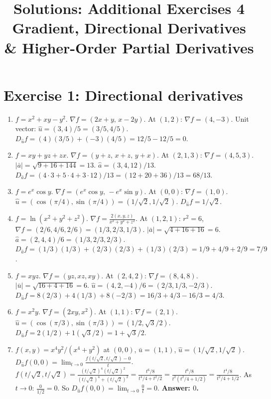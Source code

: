\documentclass[12pt,a4paper]{article}
\title{\textbf{Solutions: Additional Exercises 4}\\
\large Gradient, Directional Derivatives \& Higher-Order Partial Derivatives}
\date{}
\begin{document}
\maketitle
\thispagestyle{empty}

\section*{Exercise 1: Directional derivatives}

\begin{enumerate}[leftmargin=*, label=(\alph*)]

\item $f=x^2+xy-y^2$. $\nabla f=(2x+y,\,x-2y)$. At $(1,2)$: $\nabla f=(4,-3)$.
Unit vector: $\hat{u}=(3,4)/5=(3/5,4/5)$.
$D_{\hat{u}}f=(4)(3/5)+(-3)(4/5)=12/5-12/5=0$.

\item $f=xy+yz+zx$. $\nabla f=(y+z,\,x+z,\,y+x)$. At $(2,1,3)$: $\nabla f=(4,5,3)$.
$|\bar{a}|=\sqrt{9+16+144}=13$. $\hat{a}=(3,4,12)/13$.
$D_{\hat{a}}f=(4\cdot 3+5\cdot 4+3\cdot 12)/13=(12+20+36)/13=68/13$.

\item $f=e^x\cos y$. $\nabla f=(e^x\cos y,\,-e^x\sin y)$. At $(0,0)$: $\nabla f=(1,0)$.
$\hat{u}=(\cos(\pi/4),\sin(\pi/4))=(1/\sqrt{2},1/\sqrt{2})$.
$D_{\hat{u}}f=1/\sqrt{2}$.

\item $f=\ln(x^2+y^2+z^2)$. $\nabla f=\frac{2(x,y,z)}{x^2+y^2+z^2}$. At $(1,2,1)$: $r^2=6$, $\nabla f=(2/6,4/6,2/6)=(1/3,2/3,1/3)$.
$|\bar{a}|=\sqrt{4+16+16}=6$. $\hat{a}=(2,4,4)/6=(1/3,2/3,2/3)$.
$D_{\hat{a}}f=(1/3)(1/3)+(2/3)(2/3)+(1/3)(2/3)=1/9+4/9+2/9=7/9$.

\item $f=xyz$. $\nabla f=(yz,xz,xy)$. At $(2,4,2)$: $\nabla f=(8,4,8)$.
$|\bar{u}|=\sqrt{16+4+16}=6$. $\hat{u}=(4,2,-4)/6=(2/3,1/3,-2/3)$.
$D_{\hat{u}}f=8(2/3)+4(1/3)+8(-2/3)=16/3+4/3-16/3=4/3$.

\item $f=x^2y$. $\nabla f=(2xy,x^2)$. At $(1,1)$: $\nabla f=(2,1)$.
$\hat{u}=(\cos(\pi/3),\sin(\pi/3))=(1/2,\sqrt{3}/2)$.
$D_{\hat{u}}f=2(1/2)+1(\sqrt{3}/2)=1+\sqrt{3}/2$.

\item $f(x,y)=x^4y^2/(x^4+y^2)$ at $(0,0)$, $\bar{u}=(1,1)$, $\hat{u}=(1/\sqrt{2},1/\sqrt{2})$.
$D_{\hat{u}}f(0,0)=\lim_{t\to 0}\frac{f(t/\sqrt{2},t/\sqrt{2})-0}{t}$.
$f(t/\sqrt{2},t/\sqrt{2})=\frac{(t/\sqrt{2})^4(t/\sqrt{2})^2}{(t/\sqrt{2})^4+(t/\sqrt{2})^2}=\frac{t^6/8}{t^4/4+t^2/2}=\frac{t^6/8}{t^2(t^2/4+1/2)}=\frac{t^4/8}{t^2/4+1/2}$.
As $t\to 0$: $\frac{0}{1/2}=0$. So $D_{\hat{u}}f(0,0)=\lim_{t\to 0}\frac{0}{t}=0$.
\textbf{Answer: $0$.}

\end{enumerate}
\end{document}
